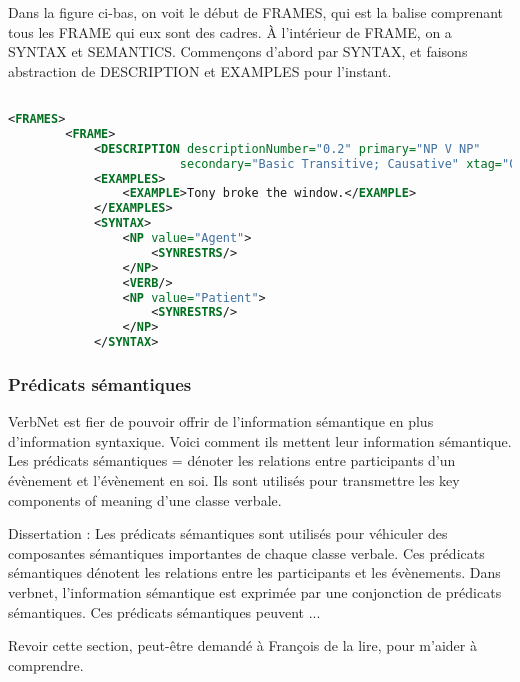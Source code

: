 Dans la figure ci-bas, on voit le début de FRAMES, qui est la balise comprenant tous les FRAME qui eux sont des cadres. À l'intérieur de FRAME, on a SYNTAX et SEMANTICS. Commençons d'abord par SYNTAX, et faisons abstraction de DESCRIPTION et EXAMPLES pour l'instant.

\begin{lstlisting}[language=Xml, caption = cadres syntaxiques]

<FRAMES>
        <FRAME>
            <DESCRIPTION descriptionNumber="0.2" primary="NP V NP"
						secondary="Basic Transitive; Causative" xtag="0.2"/>
            <EXAMPLES>
                <EXAMPLE>Tony broke the window.</EXAMPLE>
            </EXAMPLES>
            <SYNTAX>
                <NP value="Agent">
                    <SYNRESTRS/>
                </NP>
                <VERB/>
                <NP value="Patient">
                    <SYNRESTRS/>
                </NP>
            </SYNTAX>
\end{lstlisting}

\subsubsection{Prédicats sémantiques}

VerbNet est fier de pouvoir offrir de l'information sémantique en plus d'information syntaxique. Voici comment ils mettent leur information sémantique.
Les prédicats sémantiques = dénoter les relations entre participants d'un évènement et l'évènement en soi. Ils sont utilisés pour transmettre les key components of meaning d'une classe verbale.

Dissertation : Les prédicats sémantiques sont utilisés pour véhiculer des composantes sémantiques importantes de chaque classe verbale. Ces prédicats sémantiques dénotent les relations entre les participants et les évènements. Dans verbnet, l'information sémantique est exprimée par une conjonction de prédicats sémantiques. Ces prédicats sémantiques peuvent ...

Revoir cette section, peut-être demandé à François de la lire, pour m'aider à comprendre.

